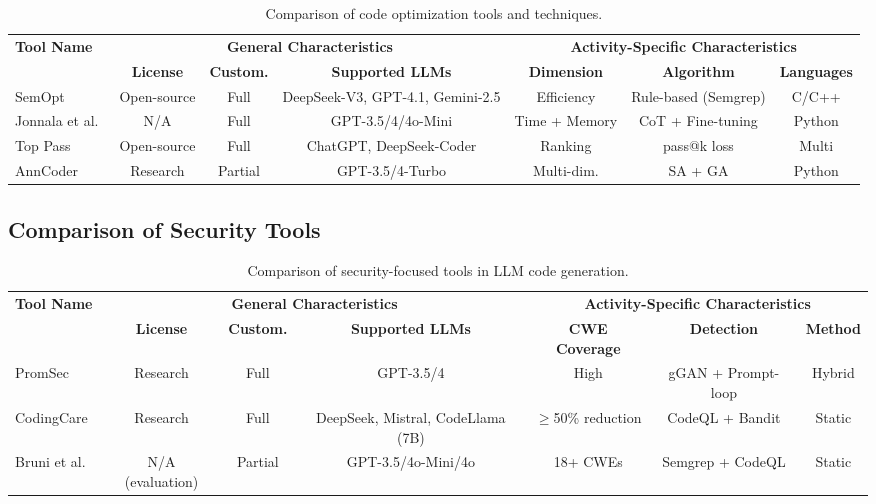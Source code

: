 \documentclass[11pt,a4paper]{article}
\begin{document}
\begin{table}[H]
\centering
\caption{Comparison of code optimization tools and techniques.}
\label{tab:cmp_optimization}
\scriptsize
\begin{tabular}{@{}lcccccc@{}}
\toprule
\multirow{2}{*}{\textbf{Tool Name}} & \multicolumn{3}{c}{\textbf{General Characteristics}} & \multicolumn{3}{c}{\textbf{Activity-Specific Characteristics}} \\
\cmidrule(lr){2-4} \cmidrule(lr){5-7}
 & \textbf{License} & \textbf{Custom.} & \textbf{Supported LLMs} & \textbf{Dimension} & \textbf{Algorithm} & \textbf{Languages} \\
\midrule
SemOpt~\cite{zhao2025semopt} & Open-source & Full & DeepSeek-V3, GPT-4.1, Gemini-2.5 & Efficiency & Rule-based (Semgrep) & C/C++ \\
Jonnala et al.~\cite{jonnala2025} & N/A & Full & GPT-3.5/4/4o-Mini & Time + Memory & CoT + Fine-tuning & Python \\
Top Pass~\cite{lyu2025toppass} & Open-source & Full & ChatGPT, DeepSeek-Coder & Ranking & pass@k loss & Multi \\
AnnCoder~\cite{zhang2025anncoder} & Research & Partial & GPT-3.5/4-Turbo & Multi-dim. & SA + GA & Python \\
\bottomrule
\end{tabular}
\end{table}

\subsection{Comparison of Security Tools}

\begin{table}[H]
\centering
\caption{Comparison of security-focused tools in LLM code generation.}
\label{tab:cmp_security}
\scriptsize
\begin{tabular}{@{}lcccccc@{}}
\toprule
\multirow{2}{*}{\textbf{Tool Name}} & \multicolumn{3}{c}{\textbf{General Characteristics}} & \multicolumn{3}{c}{\textbf{Activity-Specific Characteristics}} \\
\cmidrule(lr){2-4} \cmidrule(lr){5-7}
 & \textbf{License} & \textbf{Custom.} & \textbf{Supported LLMs} & \textbf{CWE Coverage} & \textbf{Detection} & \textbf{Method} \\
\midrule
PromSec~\cite{nazzal2024promsec} & Research & Full & GPT-3.5/4 & High & gGAN + Prompt-loop & Hybrid \\
CodingCare~\cite{ding2025codingcare} & Research & Full & DeepSeek, Mistral, CodeLlama (7B) & $\geq$50\% reduction & CodeQL + Bandit & Static \\
Bruni et al.~\cite{bruni2025} & N/A (evaluation) & Partial & GPT-3.5/4o-Mini/4o & 18+ CWEs & Semgrep + CodeQL & Static \\
\bottomrule
\end{tabular}
\end{table}
\end{document}
